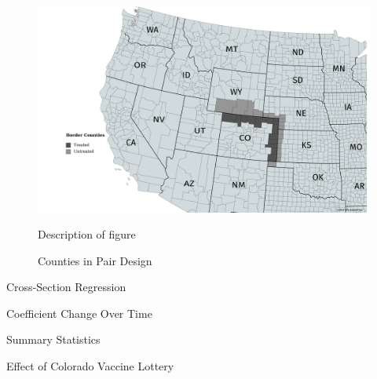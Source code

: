 \documentclass[12pt]{article}
\begin{document}
\begin{spacing}{1.5}
		\begin{figure}
			\centering
			\includegraphics[width=6in]{../graphs/Border_Counties.png}
			\caption*{\footnotesize{Description of figure}}
			\caption{Counties in Pair Design}
			\label{fig:bordercounties}
		\end{figure}
		
		\begin{table}
			\centering
			\caption{Cross-Section Regression}
			\centerline{}
			\label{table:crosssection}
		\end{table}
		
		\begin{table}
			\centering
			\caption{Coefficient Change Over Time}
			\centerline{}
			\label{table:trends}
		\end{table}
		
		\begin{table}
			\centering
			\caption{Summary Statistics}
			\centerline{}
			\label{table:didsummary}
		\end{table}
	
		\begin{table}
			\centering
			\caption{Effect of Colorado Vaccine Lottery}
			\centerline{}
			\label{table:didresults}
		\end{table}
	\end{spacing}
\end{document}
